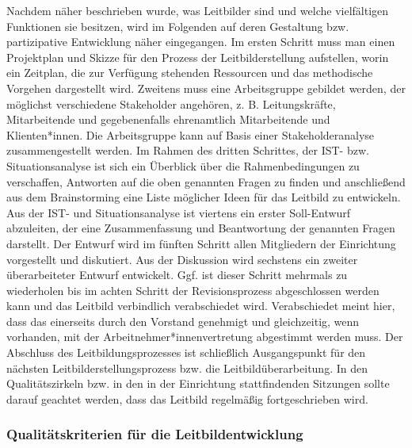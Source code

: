 \documentclass[
  letterpaper,
]{book}
\begin{document}
Nachdem näher beschrieben wurde, was Leitbilder sind und welche
vielfältigen Funktionen sie besitzen, wird im Folgenden auf deren
Gestaltung bzw. partizipative Entwicklung näher eingegangen. Im ersten
Schritt muss man einen Projektplan und Skizze für den Prozess der
Leitbilderstellung aufstellen, worin ein Zeitplan, die zur Verfügung
stehenden Ressourcen und das methodische Vorgehen dargestellt wird.
Zweitens muss eine Arbeitsgruppe gebildet werden, der möglichst
verschiedene Stakeholder angehören, z. B. Leitungskräfte, Mitarbeitende
und gegebenenfalls ehrenamtlich Mitarbeitende und Klienten*innen. Die
Arbeitsgruppe kann auf Basis einer Stakeholderanalyse zusammengestellt
werden. Im Rahmen des dritten Schrittes, der IST- bzw. Situationsanalyse
ist sich ein Überblick über die Rahmenbedingungen zu verschaffen,
Antworten auf die oben genannten Fragen zu finden und anschließend aus
dem Brainstorming eine Liste möglicher Ideen für das Leitbild zu
entwickeln. Aus der IST- und Situationsanalyse ist viertens ein erster
Soll-Entwurf abzuleiten, der eine Zusammenfassung und Beantwortung der
genannten Fragen darstellt. Der Entwurf wird im fünften Schritt allen
Mitgliedern der Einrichtung vorgestellt und diskutiert. Aus der
Diskussion wird sechstens ein zweiter überarbeiteter Entwurf entwickelt.
Ggf. ist dieser Schritt mehrmals zu wiederholen bis im achten Schritt
der Revisionsprozess abgeschlossen werden kann und das Leitbild
verbindlich verabschiedet wird. Verabschiedet meint hier, dass das
einerseits durch den Vorstand genehmigt und gleichzeitig, wenn
vorhanden, mit der Arbeitnehmer*innenvertretung abgestimmt werden muss.
Der Abschluss des Leitbildungsprozesses ist schließlich Ausgangspunkt
für den nächsten Leitbilderstellungsprozess bzw. die
Leitbildüberarbeitung. In den Qualitätszirkeln bzw. in den in der
Einrichtung stattfindenden Sitzungen sollte darauf geachtet werden, dass
das Leitbild regelmäßig fortgeschrieben wird.

\subsubsection{Qualitätskriterien für die
Leitbildentwicklung}\label{qualituxe4tskriterien-fuxfcr-die-leitbildentwicklung}
\end{document}
